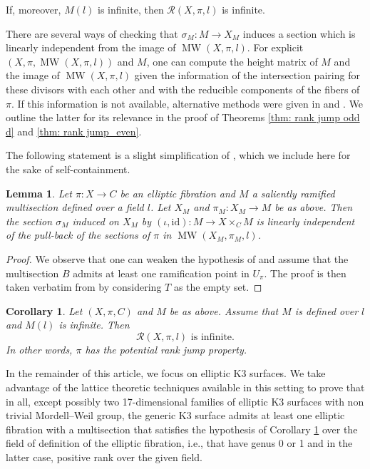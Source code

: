 \documentclass{amsart}
\newtheorem{lemma}[theorem]{Lemma}
\newtheorem{corollary}[theorem]{Corollary}
\theoremstyle{definition}
\numberwithin{equation}{section}
\DeclareMathOperator{\MW}{MW}
\begin{document}
If, moreover, $M(l)$ is infinite, then $\mathcal{R}(X,\pi, l)$ is infinite.

There are several ways of checking that $\sigma_M : M \rightarrow X_M$ induces a section which is linearly independent from the image of $\MW(X,\pi,l)$. For explicit $(X, \pi, \MW(X,\pi,l))$ and $M$, one can compute the height matrix of $M$ and the image of $\MW(X,\pi,l)$ given the information of the intersection pairing for these divisors with each other and with the reducible components of the fibers of $\pi$. If this information is not available, alternative methods were given in \cite{SalgadoANT} and \cite{PastenSalgado}. We outline the latter for its relevance in the proof of Theorems \ref{thm: rank jump odd d} and \ref{thm: rank jump_even}.

The following statement is a slight simplification of \cite[Lemma 3.1]{PastenSalgado}, which we include here for the sake of self-containment.

\begin{lemma}\label{lem:indep_multisections}
Let $\pi:X \rightarrow C$ be an elliptic fibration and $M$ a saliently ramified multisection defined over a field $l$. Let $X_M$ and $\pi_M: X_M \rightarrow M$ be as above. Then the section $\sigma_M$ induced on $X_M$ by $(\iota, \mathrm{id}):M \rightarrow X \times_C M$ is linearly independent of the pull-back of the sections of $\pi$ in $\MW(X_M,\pi_M,l)$.
\end{lemma} 

\begin{proof}
We observe that one can weaken the hypothesis of \cite[Lemma 3.1]{PastenSalgado} and assume that the multisection $B$ admits at least one ramification point in $U_\pi$. The proof is then taken verbatim from \cite{PastenSalgado} by considering $T$ as the empty set. 
\end{proof}

\begin{corollary}\label{cor: rank jump}
Let $(X, \pi, C)$ and $M$ be as above. Assume that $M$ is defined over $l$ and $M(l)$ is infinite. Then \[
\mathcal{R}(X, \pi, l) \text{ is infinite.}
\]
In other words, $\pi$ has the potential rank jump property.
\end{corollary}


In the remainder of this article, we focus on elliptic K3 surfaces. We take advantage of the lattice theoretic techniques available in this setting to prove that in all, except possibly two 17-dimensional families of elliptic K3 surfaces with non trivial Mordell--Weil group, the generic K3 surface admits at least one elliptic fibration with a multisection that satisfies the hypothesis of Corollary \ref{cor: rank jump} over the field of definition of the elliptic fibration, i.e., that have genus 0 or 1 and in the latter case, positive rank over the given field.
\end{document}
